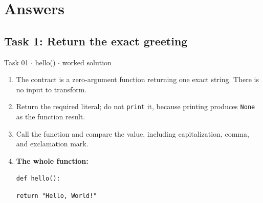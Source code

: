 \documentclass[11pt]{article}
\begin{document}
\section{Answers}
\begin{keepsection}\subsection{Task 1: Return the exact greeting}

\begin{workedbox}{Task 01 \ensuremath{\cdot} hello() \ensuremath{\cdot} worked solution}
\begin{enumerate}
\item The contract is a zero-argument function returning one exact string. There is no input to transform.
\item Return the required literal; do not \texttt{print} it, because printing produces \texttt{None} as the function result.
\item Call the function and compare the value, including capitalization, comma, and exclamation mark.
\item {}
\textbf{The whole function:}
\begin{tcolorbox}[colback=Paperblue,colframe=Paperblue,boxrule=0pt,arc=0pt,left=7pt,right=7pt,top=5pt,bottom=5pt]\small\sloppy
\noindent\hspace*{0em}\texttt{def hello():}\par
\noindent\hspace*{1em}\texttt{return "Hello, World!"}\par
\end{tcolorbox}
\end{enumerate}
\end{workedbox}

\end{keepsection}
\end{document}

